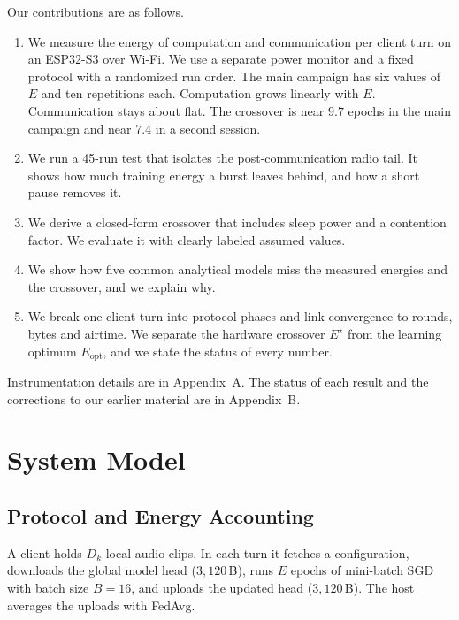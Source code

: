 \documentclass[journal]{IEEEtran}
\newcommand{\Estar}{E^{\star}}
\begin{document}
Our contributions are as follows.
\begin{enumerate}
\item We measure the energy of computation and communication per client turn on an ESP32-S3 over Wi-Fi. We use a separate power monitor and a fixed protocol with a randomized run order. The main campaign has six values of $E$ and ten repetitions each. Computation grows linearly with $E$. Communication stays about flat. The crossover is near $9.7$ epochs in the main campaign and near $7.4$ in a second session.
\item We run a 45-run test that isolates the post-communication radio tail. It shows how much training energy a burst leaves behind, and how a short pause removes it.
\item We derive a closed-form crossover that includes sleep power and a contention factor. We evaluate it with clearly labeled assumed values.
\item We show how five common analytical models miss the measured energies and the crossover, and we explain why.
\item We break one client turn into protocol phases and link convergence to rounds, bytes and airtime. We separate the hardware crossover $\Estar$ from the learning optimum $E_{\mathrm{opt}}$, and we state the status of every number.
\end{enumerate}
Instrumentation details are in Appendix~A. The status of each result and the corrections to our earlier material are in Appendix~B.

\section{System Model}
\subsection{Protocol and Energy Accounting}
A client holds $D_k$ local audio clips. In each turn it fetches a configuration, downloads the global model head ($3{,}120$\,B), runs $E$ epochs of mini-batch SGD with batch size $B=16$, and uploads the updated head ($3{,}120$\,B). The host averages the uploads with FedAvg.
\end{document}
